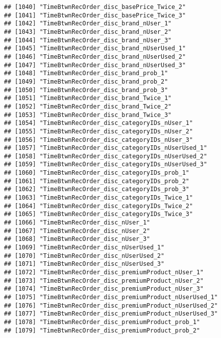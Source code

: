 \documentclass[10pt]{report}
\begin{document}
\begin{verbatim}
## [1040] "TimeBtwnRecOrder_disc_basePrice_Twice_2"              
## [1041] "TimeBtwnRecOrder_disc_basePrice_Twice_3"              
## [1042] "TimeBtwnRecOrder_disc_brand_nUser_1"                  
## [1043] "TimeBtwnRecOrder_disc_brand_nUser_2"                  
## [1044] "TimeBtwnRecOrder_disc_brand_nUser_3"                  
## [1045] "TimeBtwnRecOrder_disc_brand_nUserUsed_1"              
## [1046] "TimeBtwnRecOrder_disc_brand_nUserUsed_2"              
## [1047] "TimeBtwnRecOrder_disc_brand_nUserUsed_3"              
## [1048] "TimeBtwnRecOrder_disc_brand_prob_1"                   
## [1049] "TimeBtwnRecOrder_disc_brand_prob_2"                   
## [1050] "TimeBtwnRecOrder_disc_brand_prob_3"                   
## [1051] "TimeBtwnRecOrder_disc_brand_Twice_1"                  
## [1052] "TimeBtwnRecOrder_disc_brand_Twice_2"                  
## [1053] "TimeBtwnRecOrder_disc_brand_Twice_3"                  
## [1054] "TimeBtwnRecOrder_disc_categoryIDs_nUser_1"            
## [1055] "TimeBtwnRecOrder_disc_categoryIDs_nUser_2"            
## [1056] "TimeBtwnRecOrder_disc_categoryIDs_nUser_3"            
## [1057] "TimeBtwnRecOrder_disc_categoryIDs_nUserUsed_1"        
## [1058] "TimeBtwnRecOrder_disc_categoryIDs_nUserUsed_2"        
## [1059] "TimeBtwnRecOrder_disc_categoryIDs_nUserUsed_3"        
## [1060] "TimeBtwnRecOrder_disc_categoryIDs_prob_1"             
## [1061] "TimeBtwnRecOrder_disc_categoryIDs_prob_2"             
## [1062] "TimeBtwnRecOrder_disc_categoryIDs_prob_3"             
## [1063] "TimeBtwnRecOrder_disc_categoryIDs_Twice_1"            
## [1064] "TimeBtwnRecOrder_disc_categoryIDs_Twice_2"            
## [1065] "TimeBtwnRecOrder_disc_categoryIDs_Twice_3"            
## [1066] "TimeBtwnRecOrder_disc_nUser_1"                        
## [1067] "TimeBtwnRecOrder_disc_nUser_2"                        
## [1068] "TimeBtwnRecOrder_disc_nUser_3"                        
## [1069] "TimeBtwnRecOrder_disc_nUserUsed_1"                    
## [1070] "TimeBtwnRecOrder_disc_nUserUsed_2"                    
## [1071] "TimeBtwnRecOrder_disc_nUserUsed_3"                    
## [1072] "TimeBtwnRecOrder_disc_premiumProduct_nUser_1"         
## [1073] "TimeBtwnRecOrder_disc_premiumProduct_nUser_2"         
## [1074] "TimeBtwnRecOrder_disc_premiumProduct_nUser_3"         
## [1075] "TimeBtwnRecOrder_disc_premiumProduct_nUserUsed_1"     
## [1076] "TimeBtwnRecOrder_disc_premiumProduct_nUserUsed_2"     
## [1077] "TimeBtwnRecOrder_disc_premiumProduct_nUserUsed_3"     
## [1078] "TimeBtwnRecOrder_disc_premiumProduct_prob_1"          
## [1079] "TimeBtwnRecOrder_disc_premiumProduct_prob_2"          

\end{verbatim}
\end{document}
